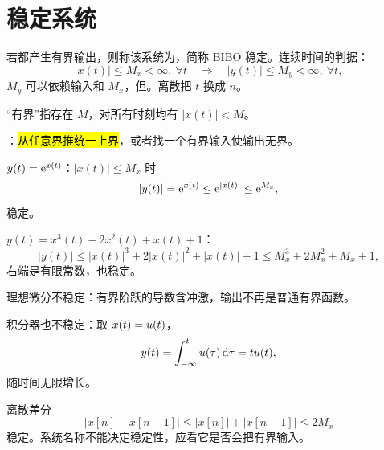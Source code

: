 \section{稳定系统}
\label{sec:stable-systems}

\begin{definition}
  \label{def:bibo-stable-system}
  若都产生有界输出，则称该系统为，简称 BIBO 稳定。连续时间的判据：
  \[
    |x(t)|\le M_x<\infty,\ \forall t
    \quad\Longrightarrow\quad
    |y(t)|\le M_y<\infty,\ \forall t,
  \]
  $M_y$ 可以依赖输入和 $M_x$，但。离散把 $t$ 换成 $n$。
\end{definition}

“有界”指存在 $M$，对所有时刻均有 $|x(t)|<M$。

：\hl{从任意界推统一上界}，或者找一个有界输入使输出无界。

\begin{example}[逐点非线性仍然稳定]
  $y(t)=\mathrm{e}^{x(t)}$：$|x(t)|\le M_x$ 时
  \[
    |y(t)|=\mathrm{e}^{x(t)}\le \mathrm{e}^{|x(t)|}\le \mathrm{e}^{M_x},
  \]
  稳定。

  $y(t)=x^3(t)-2x^2(t)+x(t)+1$：
  \[
    |y(t)|\le |x(t)|^3+2|x(t)|^2+|x(t)|+1
    \le M_x^3+2M_x^2+M_x+1,
  \]
  右端是有限常数，也稳定。
\end{example}

\begin{example}[微分、积分、差分]
  理想微分不稳定：有界阶跃的导数含冲激，输出不再是普通有界函数。

  积分器也不稳定：取 $x(t)=u(t)$，
  \[
    y(t)=\int_{-\infty}^{t}u(\tau)\mathop{}\!\mathrm{d}\tau=tu(t),
  \]
  随时间无限增长。

  离散差分
  \[
    |x[n]-x[n-1]|\le |x[n]|+|x[n-1]|\le2M_x
  \]
  稳定。系统名称不能决定稳定性，应看它是否会把有界输入。
\end{example}


